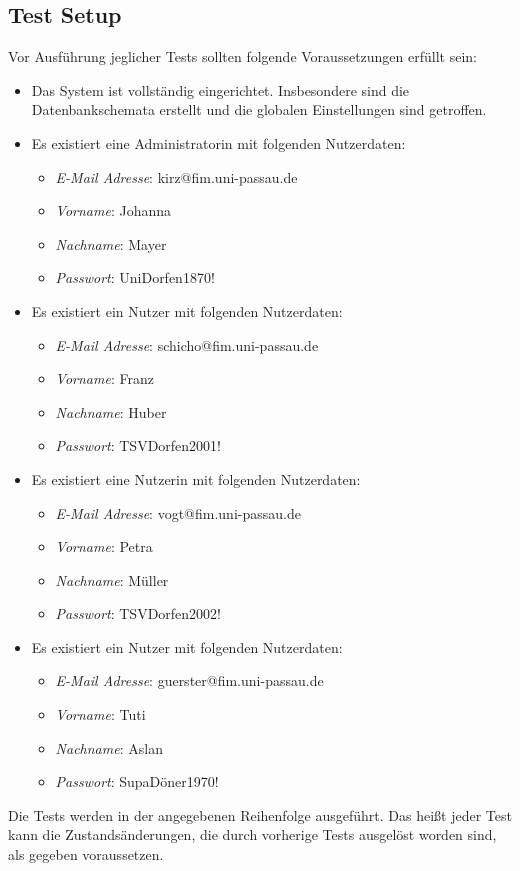 \subsection{Test Setup}
Vor Ausführung jeglicher Tests sollten folgende Voraussetzungen erfüllt sein:
\begin{itemize}
	\item Das System ist vollständig eingerichtet.
	Insbesondere sind die Datenbankschemata erstellt und die globalen Einstellungen sind getroffen.
	\item Es existiert eine Administratorin mit folgenden Nutzerdaten:
	\begin{itemize}
		\item \emph{E-Mail Adresse}: kirz@fim.uni-passau.de
		\item \emph{Vorname}: Johanna
		\item \emph{Nachname}: Mayer
		\item \emph{Passwort}: UniDorfen1870!
	\end{itemize}
	\item Es existiert ein Nutzer mit folgenden Nutzerdaten:
	\begin{itemize}
		\item \emph{E-Mail Adresse}: schicho@fim.uni-passau.de
		\item \emph{Vorname}: Franz
		\item \emph{Nachname}: Huber
		\item \emph{Passwort}: TSVDorfen2001!
	\end{itemize}
	\item Es existiert eine Nutzerin mit folgenden Nutzerdaten:
	\begin{itemize}
		\item \emph{E-Mail Adresse}: vogt@fim.uni-passau.de
		\item \emph{Vorname}: Petra
		\item \emph{Nachname}: Müller
		\item \emph{Passwort}: TSVDorfen2002!
	\end{itemize}
	\item Es existiert ein Nutzer mit folgenden Nutzerdaten:
	\begin{itemize}
		\item \emph{E-Mail Adresse}: guerster@fim.uni-passau.de
		\item \emph{Vorname}: Tuti
		\item \emph{Nachname}: Aslan
		\item \emph{Passwort}: SupaDöner1970!
	\end{itemize}
\end{itemize}
Die Tests werden in der angegebenen Reihenfolge ausgeführt.
Das heißt jeder Test kann die Zustandsänderungen, die durch vorherige Tests ausgelöst worden sind, als gegeben voraussetzen.
